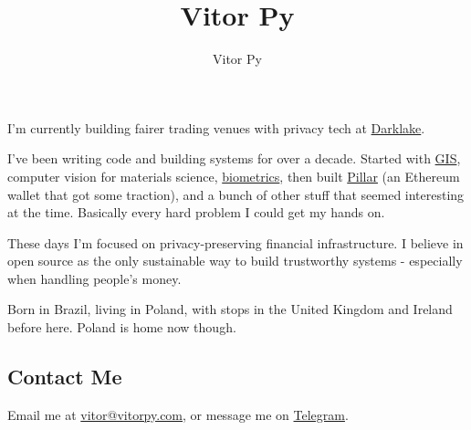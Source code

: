 \documentclass{article}
\title{Vitor Py}
\author{Vitor Py}
\date{}
\begin{document}

\maketitle

I'm currently building fairer trading venues with privacy tech at \href{https://darklake.fi}{Darklake}.

I've been writing code and building systems for over a decade. Started with \href{https://www.dpi.inpe.br/spring}{GIS}, computer vision for materials science, \href{https://github.com/vitorpy/qwsqviewer}{biometrics}, then built \href{https://pillar.fi}{Pillar} (an Ethereum wallet that got some traction), and a bunch of other stuff that seemed interesting at the time. Basically every hard problem I could get my hands on.

These days I'm focused on privacy-preserving financial infrastructure. I believe in open source as the only sustainable way to build trustworthy systems - especially when handling people's money.

Born in Brazil, living in Poland, with stops in the United Kingdom and Ireland before here. Poland is home now though.

\subsection{Contact Me}

Email me at \href{mailto:vitor@vitorpy.com}{vitor@vitorpy.com}, or message me on \href{https://t.me/vitorpy}{Telegram}.


\end{document}
